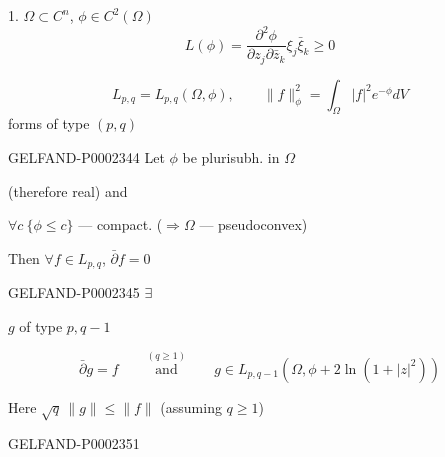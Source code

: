1. $\Omega\subset C^n$, $\phi\in C^2(\Omega)$
\begin{equation*}
 L (\phi)=\frac{\partial^2\phi}{\partial z_j\partial\bar z_k}\xi_j\bar\xi_k\ge0
\end{equation*}



\begin{equation*}
 L_{p, q}=L_{p, q}(\Omega,\phi),\qquad
 \|f\|_\phi^2=\int_\Omega |f|^2e^{-\phi}dV
\end{equation*}
forms of type $(p, q)$



\begin{GelfandAdjacentEvidence}{GELFAND-P000234}{4}
Let $\phi$ be plurisubh. in $\Omega$ 
\end{GelfandAdjacentEvidence}
 (therefore real) and

$\forall c\ \{\phi\le c\}$ — compact. ($\Rightarrow\Omega$ — pseudoconvex)



Then $\forall f\in L_{p, q}$, $\bar\partial f=0$



\begin{GelfandAdjacentEvidence}{GELFAND-P000234}{5}
$\exists$ 
\end{GelfandAdjacentEvidence}

$g$ of type $p, q-1$



\begin{equation*}
 \bar\partial g=f\qquad\overset{(q\ge1)}{\text{and}}\qquad
 g\in L_{p, q-1}(\Omega,\phi+2\ln (1+|z|^2))
\end{equation*}



Here $\sqrt q\,\|g\|\le\|f\|$ (assuming $q\ge1$)





\begin{GelfandAdjacentEvidence}{GELFAND-P000235}{1}



\end{GelfandAdjacentEvidence}

